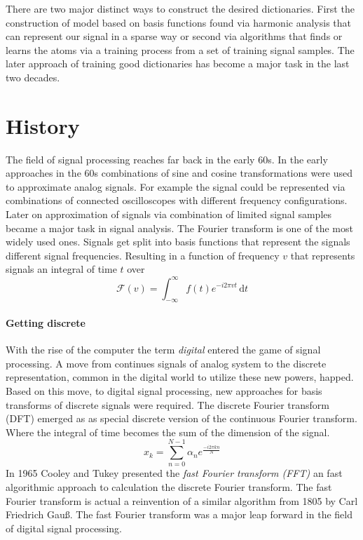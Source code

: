 There are two major distinct ways to construct the desired dictionaries. First
the construction of model based on basis functions found via harmonic analysis
that can represent our signal in a sparse way or second via algorithms that
finds or learns the atoms via a training process from a set of training signal
samples. The later approach of training good dictionaries has become a major
task in the last two decades\cite{Mairal2010}.



\section{History}
\label{sec:history}
The field of signal processing reaches far back in the early 60s.
\cite{Rubinstein2010}
In the early approaches in the 60s combinations of sine and cosine
transformations were used to approximate analog signals. For example the signal
could be represented via combinations of connected oscilloscopes with different
frequency configurations. Later on approximation of signals via combination of
limited signal samples became a major task in signal analysis.  The Fourier
transform is one of the most widely used ones. Signals get split into basis
functions that represent the signals different signal frequencies. 
Resulting in a function of frequency $v$ that represents signals an integral
of time $t$ over  
\begin{equation*}
\mathcal{F}\left(v\right) = \int_{-\infty}^{\infty} \! f(t)e^{-i2\pi vt} \,
\mathrm{d}t
\end{equation*}

\paragraph{Getting discrete}
With the rise of the computer the term \emph{digital} entered the
game of signal processing. A move from continues signals of analog system to the
discrete representation, common in the digital world to utilize these new
powers, happed. Based on this move, to digital signal processing, new
approaches for basis transforms of discrete signals were required. The discrete
Fourier transform (DFT) emerged as as special discrete version of the continuous
Fourier transform. Where the integral of time becomes the sum of the dimension
of the signal. 
\begin{equation*}
 x_k = \sum_{n=0}^{N-1}\alpha_ne^{\frac{-i2\pi kn}{N}}
\end{equation*}
In 1965 Cooley and Tukey presented\cite{Cooley1965} the \emph{fast Fourier
transform (FFT)} an fast algorithmic approach to calculation the discrete
Fourier transform. The fast Fourier transform is actual a reinvention of a
similar algorithm from 1805 by Carl Friedrich Gauß. The fast Fourier transform
was a major leap forward in the field of digital signal processing.

